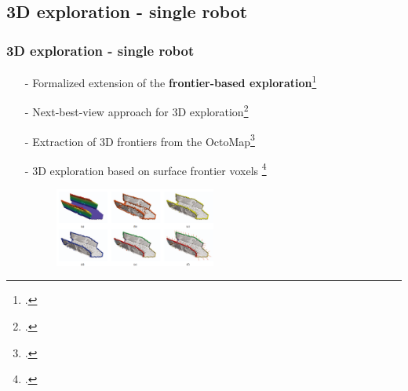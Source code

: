 \subsection{3D exploration - single robot}
\begin{frame}
	\frametitle{3D exploration - single robot}
	\begin{itemize}
		\item[-] Formalized extension of the \textbf{frontier-based exploration}\footcite{ShadeNewman2011}
		\item[-] Next-best-view approach for 3D exploration\footcite{Bircher2016}
		
		\item[-] Extraction of 3D frontiers from the OctoMap\footcite{Zhu2015}
		\item[-] 3D exploration based on surface frontier voxels \footcite{Senarathne2016} 
		\begin{figure}
			\centering
			\includegraphics[width=0.5\textwidth]{figures/senarathne}
		\end{figure}
		
		
	\end{itemize}	
\end{frame}
